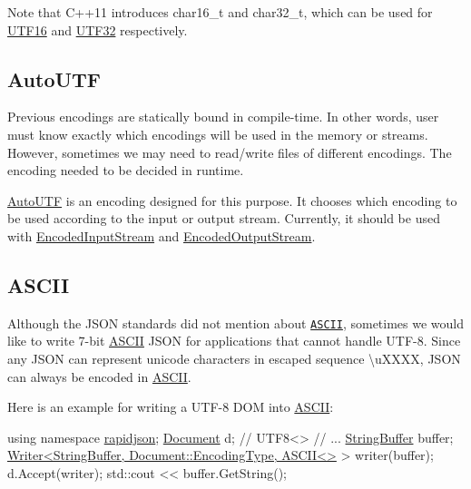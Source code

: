 Note that C++11 introduces {\ttfamily char16\+\_\+t} and {\ttfamily char32\+\_\+t}, which can be used for {\ttfamily \hyperlink{struct_u_t_f16}{U\+T\+F16}} and {\ttfamily \hyperlink{struct_u_t_f32}{U\+T\+F32}} respectively.\hypertarget{md_Commun_Externe_RapidJSON_doc_encoding.zh-cn_AutoUTF}{}\subsection{Auto\+U\+TF}\label{md_Commun_Externe_RapidJSON_doc_encoding.zh-cn_AutoUTF}
Previous encodings are statically bound in compile-\/time. In other words, user must know exactly which encodings will be used in the memory or streams. However, sometimes we may need to read/write files of different encodings. The encoding needed to be decided in runtime.

{\ttfamily \hyperlink{struct_auto_u_t_f}{Auto\+U\+TF}} is an encoding designed for this purpose. It chooses which encoding to be used according to the input or output stream. Currently, it should be used with {\ttfamily \hyperlink{class_encoded_input_stream}{Encoded\+Input\+Stream}} and {\ttfamily \hyperlink{class_encoded_output_stream}{Encoded\+Output\+Stream}}.\hypertarget{md_Commun_Externe_RapidJSON_doc_encoding.zh-cn_ASCII}{}\subsection{A\+S\+C\+II}\label{md_Commun_Externe_RapidJSON_doc_encoding.zh-cn_ASCII}
Although the J\+S\+ON standards did not mention about \href{http://en.wikipedia.org/wiki/ASCII}{\tt A\+S\+C\+II}, sometimes we would like to write 7-\/bit \hyperlink{struct_a_s_c_i_i}{A\+S\+C\+II} J\+S\+ON for applications that cannot handle U\+T\+F-\/8. Since any J\+S\+ON can represent unicode characters in escaped sequence {\ttfamily \textbackslash{}u\+X\+X\+XX}, J\+S\+ON can always be encoded in \hyperlink{struct_a_s_c_i_i}{A\+S\+C\+II}.

Here is an example for writing a U\+T\+F-\/8 D\+OM into \hyperlink{struct_a_s_c_i_i}{A\+S\+C\+II}\+:


\begin{DoxyCode}
\textcolor{keyword}{using namespace }\hyperlink{namespacerapidjson}{rapidjson};
\hyperlink{class_generic_document}{Document} d; \textcolor{comment}{// UTF8<>}
\textcolor{comment}{// ...}
\hyperlink{class_generic_string_buffer}{StringBuffer} buffer;
\hyperlink{class_writer}{Writer<StringBuffer, Document::EncodingType, ASCII<>} > 
      writer(buffer);
d.Accept(writer);
std::cout << buffer.GetString();
\end{DoxyCode}


